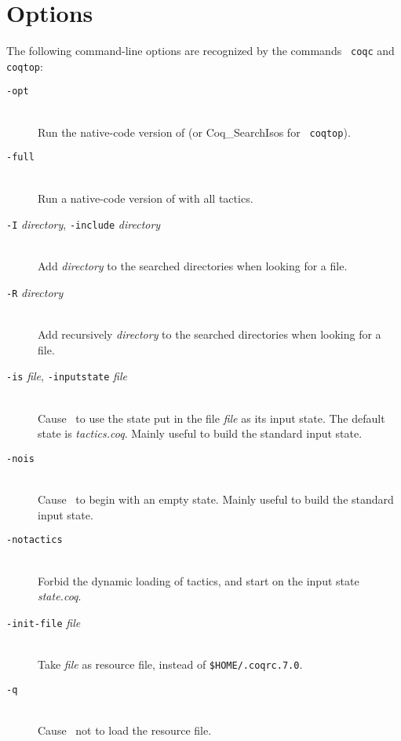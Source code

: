 \section{Options}

The following command-line options are recognized by the commands {\tt
  coqc} and {\tt coqtop}:

\begin{description}
\item[{\tt -opt}]\ \\
  Run the native-code version of \Coq{} (or {\sf Coq\_SearchIsos} for {\tt
coqtop}).

\item[{\tt -full}]\ \\
  Run a native-code version of {\Coq} with all tactics.

\item[{\tt -I} {\em directory}, {\tt -include} {\em directory}]\ \\
  Add {\em directory} to the searched directories when looking for a
  file.

\item[{\tt -R} {\em directory}]\ \\
  Add recursively {\em directory} to the searched directories when looking for
  a file.

\item[{\tt -is} {\em file}, {\tt -inputstate} {\em file}]\ \\
  Cause \Coq~to use the state put in the file {\em file} as its input
  state. The default state is {\em tactics.coq}.
  Mainly useful to build the standard input state.

\item[{\tt -nois}]\ \\
  Cause \Coq~to begin with an empty state. Mainly useful to build the
  standard input state.

\item[{\tt -notactics}]\ \\
  Forbid the dynamic loading of tactics, and start on the input state
  {\em state.coq}.

\item[{\tt -init-file} {\em file}]\ \\
  Take {\em file} as resource file, instead of {\tt \$HOME/.coqrc.7.0}.

\item[{\tt -q}]\ \\
  Cause \Coq~not to load the resource file.


\end{description}
